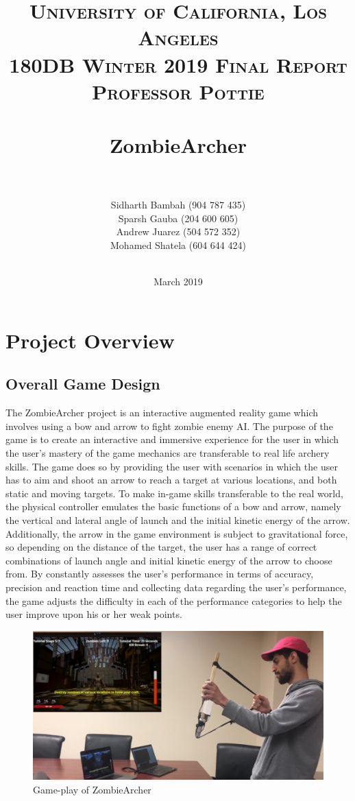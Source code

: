 \documentclass[titlepage, 12pt]{scrartcl}
\title{
		\vspace{-1in} 	
		\usefont{OT1}{bch}{b}{n}
		\normalfont \normalsize \textsc{University of California, Los Angeles \\
		180DB Winter 2019 Final Report \\
		Professor Pottie} \\ [25pt]
		\horrule{0.5pt} \\
		\Huge ZombieArcher \\
		\vspace{-.3in}
		\horrule{2pt} \\
		\vspace{1in}
}
\author{
        Sidharth Bambah (904 787 435)\\
        Sparsh Gauba (204 600 605)\\
        Andrew Juarez (504 572 352)\\
        Mohamed Shatela (604 644 424)\\\\
        \vspace{1in}
        }
\date{ \large March 2019}
\begin{document}
\maketitle
\tableofcontents
\newpage
\section{Project Overview}
    \subsection{Overall Game Design}
        The ZombieArcher project is an interactive augmented reality game which involves using a bow and arrow to fight zombie enemy AI. The purpose of the game is to create an interactive and immersive experience for the user in which the user's mastery of the game mechanics are transferable to real life archery skills. The game does so by providing the user with scenarios in which the user has to aim and shoot an arrow to reach a target at various locations, and both static and moving targets. To make in-game skills transferable to the real world, the physical controller emulates the basic functions of a bow and arrow, namely the vertical and lateral angle of launch and the initial kinetic energy of the arrow. Additionally, the arrow in the game environment is subject to gravitational force, so depending on the distance of the target, the user has a range of correct combinations of launch angle and initial kinetic energy of the arrow to choose from. By constantly assesses the user’s performance in terms of accuracy, precision and reaction time and collecting data regarding the user’s performance, the game adjusts the difficulty in each of the performance categories to help the user improve upon his or her weak points. 
        \begin{figure}
            \centering
            \includegraphics[scale=0.3]{figures/Gameplay_Picture.png}
            \caption{Game-play of ZombieArcher}
            \label{fig:external_shot}
        \end{figure}
\end{document}
